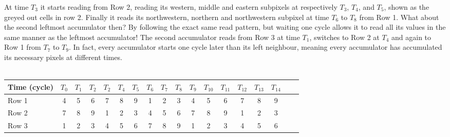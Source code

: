 At time $T_{3}$ it starts reading from Row 2, reading its western, middle and eastern subpixels at respectively $T_{3}$, $T_{4}$, and $T_{5}$, shown as the greyed out cells in row 2.
Finally it reads its northwestern, northern and northwestern subpixel at time $T_{6}$ to $T_{8}$ from Row 1.
What about the second leftmost accumulator then? By following the exact same read pattern, but waiting one cycle allows it to read all its values in the same manner as the leftmost accumulator!
The second accumulator reads from Row 3 at time $T_{1}$, switches to Row 2 at $T_{4}$ and again to Row 1 from $T_{7}$ to $T_{9}$. 
In fact, every accumulator starts one cycle later than its left neighbour, meaning every accumulator has accumulated its necessary pixels at different times.
\\ \\
\begin{tabular}{l*{16}{c}r}
    Time (cycle)        & $T_{0}$ & $T_{1}$ & $T_{2}$ & $T_{2}$ & $T_{4}$  & $T_{5}$ & $T_{6}$ & $T_{7}$ & $T_{8}$ & $T_{9}$ & $T_{10}$ & $T_{11}$ & $T_{12}$ & $T_{13}$ & $T_{14}$\\
\hline
Row 1                   & \cellcolor{gray75} 4 & 5 & 6 & 7 & 8 & 9 & 1 & \cellcolor{gray75} 2 & \cellcolor{gray75} 3 & 4\cellcolor{gray75} & 5 & 6 & 7 & 8 & 9 & \\
Row 2                   & 7 & 8 & 9 & 1 & \cellcolor{gray75} 2 & \cellcolor{gray75} 3 & \cellcolor{gray75}4 & 5 & 6 & 7 & 8 & 9 & 1 & \cellcolor{gray75} 2 & \cellcolor{gray75} 3 & \\
Row 3                   & 1 & \cellcolor{gray75} 2 & \cellcolor{gray75} 3 & 4\cellcolor{gray75} & 5 & 6 & 7 & 8 & 9 & 1 & \cellcolor{gray75} 2 & \cellcolor{gray75} 3 & 4\cellcolor{gray75} & 5 & 6 & \\
\end{tabular}\\ \\ \\


